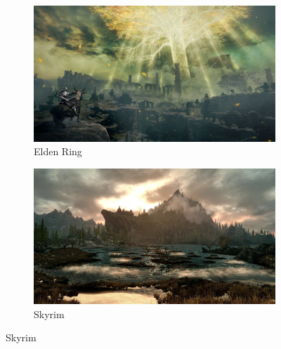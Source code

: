\documentclass[a4paper,10pt,english]{article}
\begin{document}
\begin{figure}[h]

\centering

\begin{subfigure}{0.49\linewidth}
\includegraphics[width=1\linewidth]{EldenRing.jpg}
\caption{Elden Ring}
\label{fig:elden ring}
\end{subfigure}\hfill
%
\begin{subfigure}{0.49\linewidth}
\includegraphics[width=1\linewidth]{Skyrim.jpg}
\caption{Skyrim}
\label{fig:skyrim}
\end{subfigure}\hfill

\end{figure}
\end{document}
